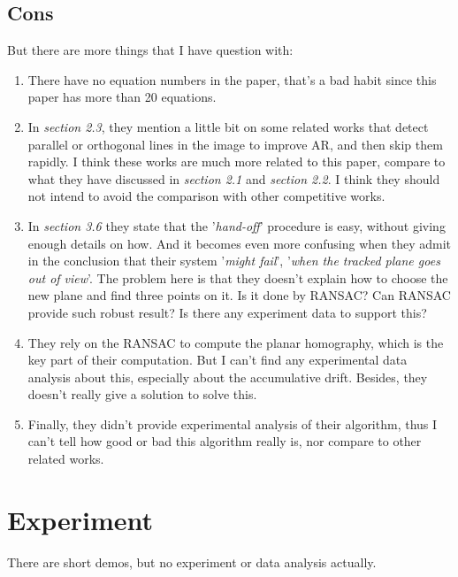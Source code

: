 \documentclass[10pt,twocolumn,letterpaper]{article}
\begin{document}
\subsection{Cons}
But there are more things that I have question with:
\begin{enumerate}

\item There have no equation numbers in the paper, that's a bad habit 
since this paper has more than 20 equations.

\item In {\em section 2.3}, they mention a little bit on 
some related works that detect parallel or orthogonal lines in the image 
to improve AR, and then skip them rapidly. 
I think these works are much more related to this paper, compare to what they 
have discussed in {\em section 2.1} and {\em section 2.2}. I think they should 
not intend to avoid the comparison with other competitive works.

\item In {\em section 3.6} they state that the '{\em hand-off}' procedure is easy, 
without giving enough details on how. And it becomes even more confusing when 
they admit in the conclusion that their system '{\em might fail}', 
'{\em when the tracked plane goes out of view}'. The problem here is that they doesn't 
explain how to choose the new plane and find three points on it. Is it done by RANSAC? 
Can RANSAC provide such robust result? Is there any experiment data to support this?

\item They rely on the RANSAC to compute the planar homography, which is the key part 
of their computation. But I can't find any experimental data analysis about this, especially 
about the accumulative drift. Besides, they doesn't really give a solution to solve this.

\item Finally, they didn't provide experimental analysis of their algorithm, thus I can't tell 
how good or bad this algorithm really is, nor compare to other related works.

\end{enumerate}

\section{Experiment}
There are short demos, but no experiment or data analysis actually.
\end{document}
